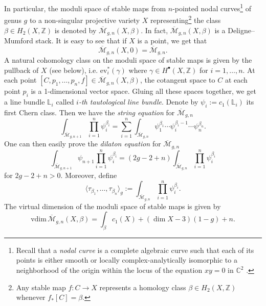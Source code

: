 \documentclass[11pt,colorinlistoftodos]{amsart}
\numberwithin{equation}{subsection}
\theoremstyle{plain}
\theoremstyle{definition}
\theoremstyle{remark}
\newcommand{\Z}{\mathbb{Z}}
\newcommand{\C}{\mathbb{C}}
\newcommand{\calM}{\mathcal{M}}
\begin{document}
In particular, the moduli space of stable maps from $n$-pointed nodal curves\footnote{Recall that a \emph{nodal curve} is a complete algebraic curve such that each of its points is either smooth or locally complex-analytically isomorphic to a neighborhood of the origin within the locus of the equation $xy=0$ in $\C^2$ \cite{ArbarelloCornalbaGriffiths2011}.} of genus $g$ to a non-singular projective variety $X$ representing\footnote{Any stable map $f\colon C\to X$ represents a homology class $\beta\in H_2(X,\mathbb{Z})$ whenever $f_*[C]=\beta$.} the class $\beta\in H_2(X,\mathbb{Z})$ is denoted by $\overline{\calM}_{g,n}(X,\beta)$. In fact, $\overline{\calM}_{g,n}(X,\beta)$ is a Deligne--Mumford stack. It is easy to see that if $X$ is a point, we get that 
\[
\overline{\calM}_{g,n}(X,0)=\overline{\calM}_{g,n}.
\]
A natural cohomology class on the moduli space of stable maps is given by the pullback of $X$ (see below), i.e. $\mathrm{ev}^*_i(\gamma)$ where $\gamma\in H^\bullet(X,\Z)$ for $i=1,\ldots, n$. At each point $[C,p_1,\ldots,p_n,f]\in\overline{\calM}_{g,n}(X,\beta)$, the cotangent space to $C$ at each point $p_i$ is a 1-dimensional vector space. Gluing all these spaces together, we get a line bundle $\mathbb{L}_i$ called \emph{$i$-th tautological line bundle}. Denote by $\psi_i:=c_1(\mathbb{L}_i)$ its first Chern class. Then we have the \emph{string equation} for $\overline{\calM}_{g,n}$ 
\begin{equation}
    \label{eq:string_eq}
    \int_{\overline{\calM}_{g,n+1}}\prod_{i=1}^n\psi_i^{\beta_i}=\sum_{i=1}^n\int_{\overline{\calM}_{g,n}}\psi_1^{\beta_1}\dotsm \psi_i^{\beta_i-1}\dotsm \psi_n^{\beta_n}.
\end{equation}
One can then easily prove the \emph{dilaton equation} for $\overline{\calM}_{g,n}$
\begin{equation}
    \label{eq:dilaton_eq}
    \int_{\overline{\calM}_{g,n+1}}\psi_{n+1}\prod_{i=1}^n\psi_i^{\beta_i}=(2g-2+n)\int_{\overline{\calM}_{g,n}}\prod_{i=1}^n\psi_i^{\beta_i}
\end{equation}
for $2g-2+n>0$.
Moreover, define 
\[
\langle \tau_{\beta_1},\ldots,\tau_{\beta_n}\rangle_g:=\int_{\overline{\calM}_{g,n}}\prod_{i=1}^n\psi_i^{\beta_i}.
\]
The virtual dimension of the moduli space of stable maps \cite{BehrendFantechi1997} is given by 
\begin{equation}
    \label{eq:virtual_dim_moduli_of_stable_maps}
    \mathrm{vdim}\, \overline{\calM}_{g,n}(X,\beta)=\int_\beta c_1(X)+(\dim X-3)(1-g)+n.
\end{equation}
\end{document}
